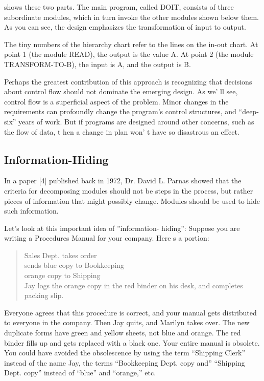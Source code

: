 
 shows these two parts. The main program, called DOIT,
consists of three subordinate modules, which in turn invoke the other
modules shown below them. As you can see, the design emphasizes the
transformation of input to output. 

The tiny numbers of the hierarchy chart refer to the lines on the in-out
chart. At point 1 (the module READ), the output is the value A. At
point 2 (the module TRANSFORM-TO-B), the input is A, and the output
is B. 

Perhaps the greatest contribution of this approach is recognizing
that decisions about control flow should not dominate the emerging
design. As we' ll see, control flow is a superficial aspect of the
problem. Minor changes in the requirements can profoundly change the
program's control structures, and {}``deep-six'' years of work.
But if programs are designed around other concerns, such as the flow
of data, t hen a change in plan won' t have so disastrous an effect.


\subsection{Information-Hiding }

In a paper {[}4{]} published back in 1972, Dr. David L. Parnas showed
that the criteria for decomposing modules should not be steps in the
process, but rather pieces of information that might possibly change.
Modules should be used to hide such information.

Let's look at this important idea of ''information- hiding'': Suppose
you are writing a Procedures Manual for your company. Here s a portion:

\begin{quote}
Sales Dept. takes order\\
sends blue copy to Bookkeeping\\
orange copy to Shipping\\
Jay logs the orange copy in the red binder on his desk, and completes
packing slip.
\end{quote}
Everyone agrees that this procedure is correct, and your manual gets
distributed to everyone in the company. Then Jay quits, and Marilyn
takes over. The new duplicate forms have green and yellow sheets,
not blue and orange. The red binder fills up and gets replaced with
a black one. Your entire manual is obsolete. You could have avoided
the obsolescence by using the term {}``Shipping Clerk'' instead
of the name Jay, the terms {}``Bookkeeping Dept. copy and'' {}``Shipping Dept.
copy'' instead of {}``blue'' and {}``orange,'' etc.


